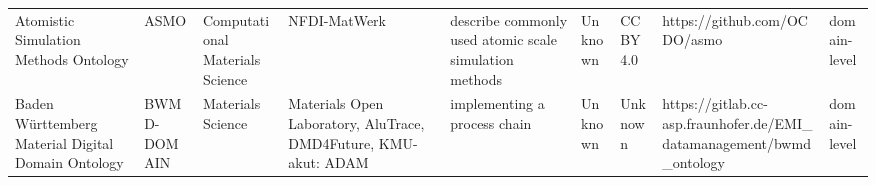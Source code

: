 \begin{tabular}{m{5cm}m{2cm}m{5cm}m{2cm}m{2cm}m{2cm}m{2cm}m{2cm}m{2cm}}
                                            Atomistic Simulation Methods Ontology &                    ASMO &             Computational Materials Science &                                                                                                                                                                                                                                                                                                                                                         NFDI-MatWerk &                                                                                                                                                                                                                                                                                                                                                 describe commonly used atomic scale simulation methods &                                                                                                            Unknown &                                    CC BY 4.0 &                                                                       https://github.com/OCDO/asmo &      domain-level \\
                               Baden Württemberg Material Digital Domain Ontology &             BWMD-DOMAIN &                           Materials Science &                                                                                                                                                                                                                                                                                                      Materials Open Laboratory, AluTrace, DMD4Future, KMU-akut: ADAM &                                                                                                                                                                                                                                                                                                                                                                           implementing a process chain &                                                                                                            Unknown &                                      Unknown &                               https://gitlab.cc-asp.fraunhofer.de/EMI_datamanagement/bwmd_ontology &      domain-level \\

\end{tabular}

